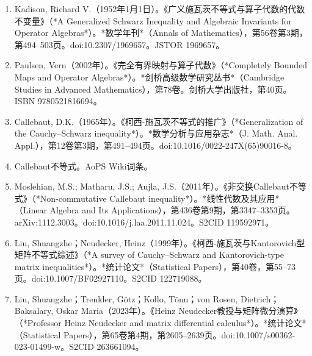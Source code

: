 \begin{enumerate}
\item Kadison, Richard V.（1952年1月1日）。《广义施瓦茨不等式与算子代数的代数不变量》（*A Generalized Schwarz Inequality and Algebraic Invariants for Operator Algebras*）。*数学年刊*（Annals of Mathematics），第56卷第3期，第494–503页。doi:10.2307/1969657。JSTOR 1969657。
\item Paulsen, Vern（2002年）。《完全有界映射与算子代数》（*Completely Bounded Maps and Operator Algebras*）。*剑桥高级数学研究丛书*（Cambridge Studies in Advanced Mathematics），第78卷。剑桥大学出版社，第40页。ISBN 9780521816694。
\item Callebaut, D.K.（1965年）。《柯西-施瓦茨不等式的推广》（*Generalization of the Cauchy–Schwarz inequality*）。*数学分析与应用杂志*（J. Math. Anal. Appl.），第12卷第3期，第491–494页。doi:10.1016/0022-247X(65)90016-8。
\item Callebaut不等式。AoPS Wiki词条。
\item Moslehian, M.S.; Matharu, J.S.; Aujla, J.S.（2011年）。《非交换Callebaut不等式》（*Non-commutative Callebaut inequality*）。*线性代数及其应用*（Linear Algebra and Its Applications），第436卷第9期，第3347–3353页。arXiv:1112.3003。doi:10.1016/j.laa.2011.11.024。S2CID 119592971。
\item Liu, Shuangzhe；Neudecker, Heinz（1999年）。《柯西-施瓦茨与Kantorovich型矩阵不等式综述》（*A survey of Cauchy–Schwarz and Kantorovich-type matrix inequalities*）。*统计论文*（Statistical Papers），第40卷，第55–73页。doi:10.1007/BF02927110。S2CID 122719088。
\item Liu, Shuangzhe；Trenkler, Götz；Kollo, Tõnu；von Rosen, Dietrich；Baksalary, Oskar Maria（2023年）。《Heinz Neudecker教授与矩阵微分演算》（*Professor Heinz Neudecker and matrix differential calculus*）。*统计论文*（Statistical Papers），第65卷第4期，第2605–2639页。doi:10.1007/s00362-023-01499-w。S2CID 263661094。
\end{enumerate}
